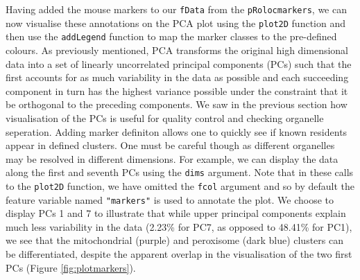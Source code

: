 Having added the mouse markers to our \texttt{fData} from the
\texttt{pRolocmarkers}, we can now visualise these annotations on
the PCA plot using the \texttt{plot2D} function and then use the
\texttt{addLegend} function to map the marker classes to the
pre-defined colours. As previously mentioned, PCA transforms the
original high dimensional data into a set of linearly uncorrelated
principal components (PCs) such that the first accounts for as much
variability in the data as possible and each succeeding component in
turn has the highest variance possible under the constraint that it
be orthogonal to the preceding components. We saw in the previous
section how visualisation of the PCs is useful for quality control and checking
organelle seperation. Adding marker definiton allows one to quickly
see if known residents appear in defined clusters. One must be
careful though as different organelles may be resolved in different
dimensions. For example, we can display the data along the first and
seventh PCs using the \texttt{dims} argument. Note that in these
calls to the \texttt{plot2D} function, we have omitted the
\texttt{fcol} argument and so by default the feature variable named
\texttt{"markers"} is used to annotate the plot. We choose to display PCs 1
and 7 to illustrate that while upper principal components explain
much less variability in the data (2.23\% for PC7, as opposed to
48.41\% for PC1), we see that the mitochondrial (purple) and
peroxisome (dark blue) clusters can be differentiated, despite the
apparent overlap in the visualisation of the two first PCs (Figure
\ref{fig:plotmarkers}).

